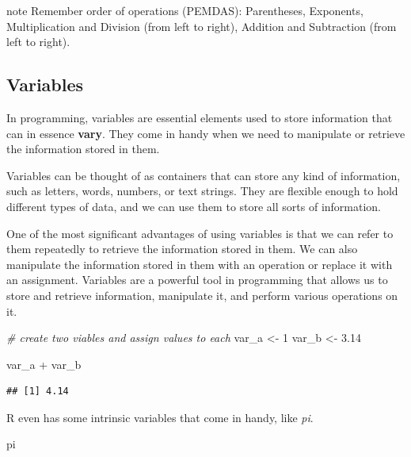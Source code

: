 \documentclass[
]{book}
\newenvironment{Shaded}{\begin{snugshade}}{\end{snugshade}}
\newcommand{\CommentTok}[1]{\textcolor[rgb]{0.56,0.35,0.01}{\textit{#1}}}
\newcommand{\DecValTok}[1]{\textcolor[rgb]{0.00,0.00,0.81}{#1}}
\newcommand{\FloatTok}[1]{\textcolor[rgb]{0.00,0.00,0.81}{#1}}
\newcommand{\NormalTok}[1]{#1}
\newcommand{\OtherTok}[1]{\textcolor[rgb]{0.56,0.35,0.01}{#1}}
\newcommand{\SpecialCharTok}[1]{\textcolor[rgb]{0.00,0.00,0.00}{#1}}
\begin{document}
\begin{infobox}{note}
Remember order of operations (PEMDAS): Parentheses, Exponents, Multiplication and Division (from left to right), Addition and Subtraction (from left to right).

\end{infobox}

\hypertarget{variables}{%
\subsection{Variables}\label{variables}}

In programming, variables are essential elements used to store information that can in essence \textbf{vary}. They come in handy when we need to manipulate or retrieve the information stored in them.

Variables can be thought of as containers that can store any kind of information, such as letters, words, numbers, or text strings. They are flexible enough to hold different types of data, and we can use them to store all sorts of information.

One of the most significant advantages of using variables is that we can refer to them repeatedly to retrieve the information stored in them. We can also manipulate the information stored in them with an operation or replace it with an assignment. Variables are a powerful tool in programming that allows us to store and retrieve information, manipulate it, and perform various operations on it.

\begin{Shaded}
\begin{Highlighting}[]
\CommentTok{\# create two viables and assign values to each}
\NormalTok{var\_a }\OtherTok{\textless{}{-}} \DecValTok{1}
\NormalTok{var\_b }\OtherTok{\textless{}{-}} \FloatTok{3.14}

\NormalTok{var\_a }\SpecialCharTok{+}\NormalTok{ var\_b}
\end{Highlighting}
\end{Shaded}

\begin{verbatim}
## [1] 4.14
\end{verbatim}

R even has some intrinsic variables that come in handy, like \emph{pi}.

\begin{Shaded}
\begin{Highlighting}[]
\NormalTok{pi}
\end{Highlighting}
\end{Shaded}
\end{document}
